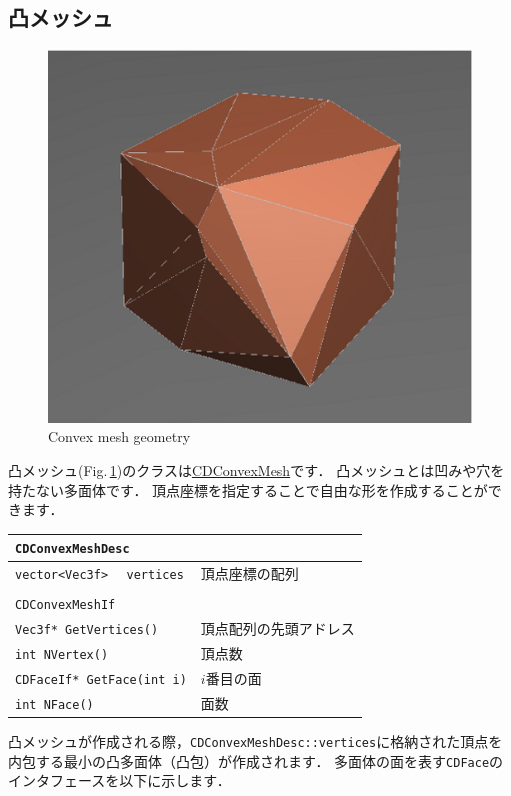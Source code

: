 \subsection*{\KLUDGE 凸メッシュ}

\begin{figure}[t]
\begin{center}
\includegraphics[width=.4\hsize]{fig/cdconvexmesh.eps}
\end{center}
\caption{Convex mesh geometry}
\label{fig_cdconvexmesh}
\end{figure}

\KLUDGE 凸メッシュ(Fig.\,\ref{fig_cdconvexmesh})\KLUDGE のクラスは\url{CDConvexMesh}\KLUDGE です．
\KLUDGE 凸メッシュとは凹みや穴を持たない多面体です．
\KLUDGE 頂点座標を指定することで自由な形を作成することができます．

\begin{center}
\begin{tabular}{lll}
\multicolumn{3}{l}{\texttt{CDConvexMeshDesc}}						\\ \midrule
\texttt{vector<Vec3f>}	&	\texttt{vertices}	& \KLUDGE 頂点座標の配列	\\
\\
\multicolumn{3}{l}{\texttt{CDConvexMeshIf}}					\\ \midrule
\multicolumn{2}{l}{\texttt{Vec3f* GetVertices()}}			& \KLUDGE 頂点配列の先頭アドレス	\\
\multicolumn{2}{l}{\texttt{int NVertex()}}					& \KLUDGE 頂点数					\\
\multicolumn{2}{l}{\texttt{CDFaceIf* GetFace(int i)}}		& $i$\KLUDGE 番目の面				\\
\multicolumn{2}{l}{\texttt{int NFace()}}					& \KLUDGE 面数						\\
\end{tabular}
\end{center}

\KLUDGE 凸メッシュが作成される際，\texttt{CDConvexMeshDesc::vertices}\KLUDGE に格納された頂点を内包する最小の凸多面体（凸包）が作成されます．
\KLUDGE 多面体の面を表す\texttt{CDFace}\KLUDGE のインタフェースを以下に示します．

